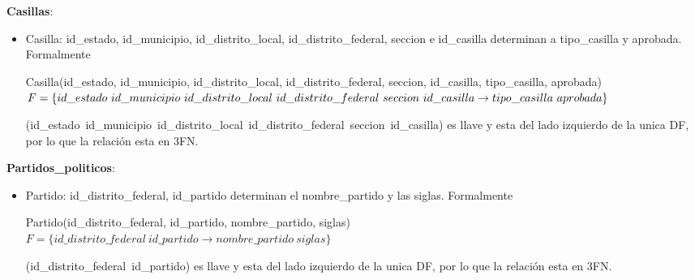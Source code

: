 \documentclass[a4paper,twoside,11pt]{article}
\begin{document}
\textbf{Casillas}:
\begin{itemize}
  \item Casilla: id\_estado, id\_municipio, id\_distrito\_local, id\_distrito\_federal, seccion
        e id\_casilla determinan a tipo\_casilla y aprobada. Formalmente

        Casilla(id\_estado, id\_municipio, id\_distrito\_local, id\_distrito\_federal,
         seccion, id\_casilla, tipo\_casilla, aprobada)\\
        $F=\{id\_estado~id\_municipio~id\_distrito\_local~id\_distrito\_federal~seccion~id\_casilla\rightarrow\\
        tipo\_casilla~aprobada\}$

        (id\_estado~id\_municipio~id\_distrito\_local~id\_distrito\_federal~seccion~id\_casilla) es
        llave y esta del lado izquierdo de la unica DF, por lo que la relación esta en 3FN.
\end{itemize}

\textbf{Partidos\_politicos}:
\begin{itemize}
  \item Partido: id\_distrito\_federal, id\_partido determinan el nombre\_partido y las siglas.
        Formalmente

        Partido(id\_distrito\_federal, id\_partido, nombre\_partido, siglas)\\
        $F=\{id\_distrito\_federal~id\_partido\rightarrow nombre\_partido~siglas\}$

        (id\_distrito\_federal~id\_partido) es llave y esta del lado izquierdo de la unica DF,
        por lo que la relación esta en 3FN.
\end{itemize}
\end{document}
